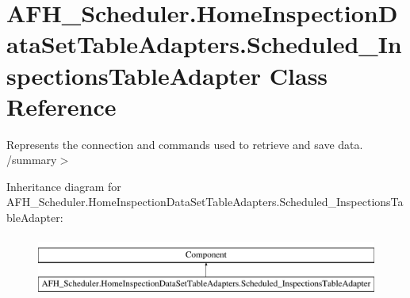 \section{A\+F\+H\+\_\+\+Scheduler.\+Home\+Inspection\+Data\+Set\+Table\+Adapters.\+Scheduled\+\_\+\+Inspections\+Table\+Adapter Class Reference}
\label{class_a_f_h___scheduler_1_1_home_inspection_data_set_table_adapters_1_1_scheduled___inspections_table_adapter}


Represents the connection and commands used to retrieve and save data. /summary$>$  


Inheritance diagram for A\+F\+H\+\_\+\+Scheduler.\+Home\+Inspection\+Data\+Set\+Table\+Adapters.\+Scheduled\+\_\+\+Inspections\+Table\+Adapter\+:\begin{figure}[H]
\begin{center}
\leavevmode
\includegraphics[height=2.000000cm]{class_a_f_h___scheduler_1_1_home_inspection_data_set_table_adapters_1_1_scheduled___inspections_table_adapter}
\end{center}
\end{figure}
